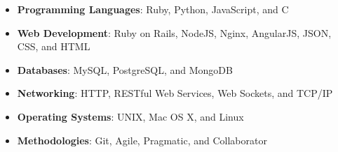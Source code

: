 \documentclass[12pt,letterpaper]{article}
\begin{document}
\begin{itemize}

  \item\textbf{Programming Languages}: Ruby, Python, JavaScript, and C
  \item\textbf{Web Development}: Ruby on Rails, NodeJS, Nginx, AngularJS, JSON, CSS, and HTML
  \item\textbf{Databases}: MySQL, PostgreSQL, and MongoDB
  \item\textbf{Networking}: HTTP, RESTful Web Services, Web Sockets, and TCP/IP
  \item\textbf{Operating Systems}: UNIX, Mac OS X, and Linux
  \item\textbf{Methodologies}: Git, Agile, Pragmatic, and Collaborator

\end{itemize}
\end{document}
